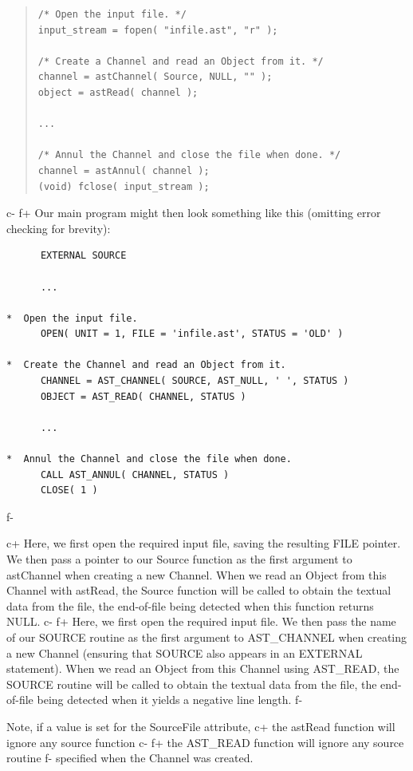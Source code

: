 \documentclass[twoside,11pt]{article}
\begin{document}
\begin{quote}
\small
\begin{verbatim}
/* Open the input file. */
input_stream = fopen( "infile.ast", "r" );

/* Create a Channel and read an Object from it. */
channel = astChannel( Source, NULL, "" );
object = astRead( channel );

...

/* Annul the Channel and close the file when done. */
channel = astAnnul( channel );
(void) fclose( input_stream );
\end{verbatim}
\normalsize
\end{quote}
c-
f+
Our main program might then look something like this (omitting error
checking for brevity):

\small
\begin{verbatim}
      EXTERNAL SOURCE

      ...

*  Open the input file.
      OPEN( UNIT = 1, FILE = 'infile.ast', STATUS = 'OLD' )

*  Create the Channel and read an Object from it.
      CHANNEL = AST_CHANNEL( SOURCE, AST_NULL, ' ', STATUS )
      OBJECT = AST_READ( CHANNEL, STATUS )

      ...

*  Annul the Channel and close the file when done.
      CALL AST_ANNUL( CHANNEL, STATUS )
      CLOSE( 1 )
\end{verbatim}
\normalsize
f-

c+
Here, we first open the required input file, saving the resulting FILE
pointer. We then pass a pointer to our Source function as the first
argument to astChannel when creating a new Channel. When we read
an Object from this Channel with astRead, the Source
function will be called to obtain the textual data from the file, the
end-of-file being detected when this function returns NULL.
c-
f+
Here, we first open the required input file.  We then pass the name of
our SOURCE routine as the first argument to AST\_CHANNEL when creating
a new Channel (ensuring that SOURCE also appears in an EXTERNAL
statement). When we read an Object from this Channel using
AST\_READ, the SOURCE routine will be called to obtain the textual
data from the file, the end-of-file being detected when it yields a
negative line length.
f-

Note, if a value is set for the SourceFile attribute,
c+
the astRead function will ignore any source function
c-
f+
the AST\_READ function will ignore any source routine
f-
specified when the Channel was created.
\end{document}

